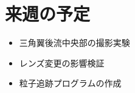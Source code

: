 \documentclass[twocolumn,a4j]{jsarticle}
\begin{document}
\section{来週の予定}
\begin{itemize}
  \item 三角翼後流中央部の撮影実験
  \item レンズ変更の影響検証
  \item 粒子追跡プログラムの作成
\end{itemize}
\end{document}
